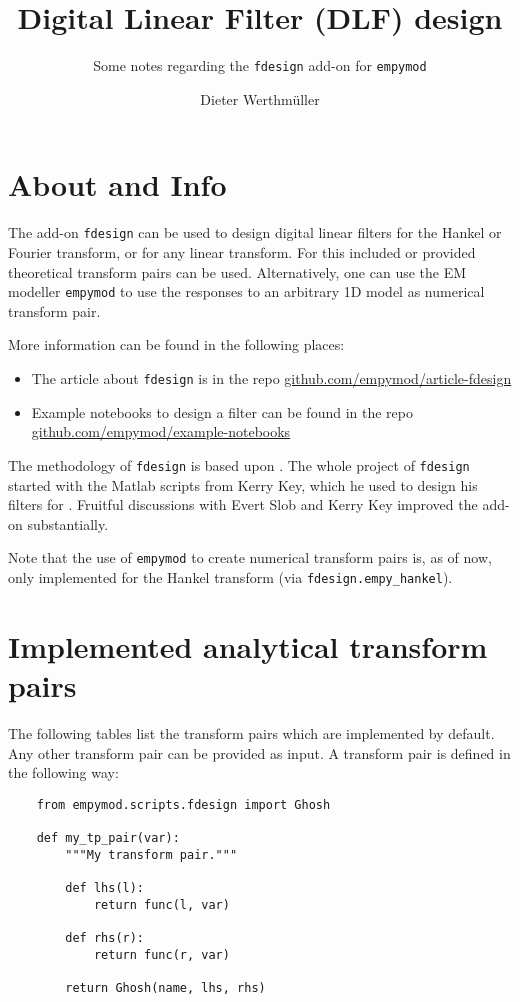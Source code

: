 \documentclass[fontsize=9pt, parskip=half, notitlepage, fleqn]{scrartcl}
\title{Digital Linear Filter (DLF) design}
\author{Dieter Werthmüller}
\subtitle{Some notes regarding the \texttt{fdesign} add-on for \texttt{empymod}}
\begin{document}
\maketitle

\section{About and Info}

The add-on \texttt{fdesign} can be used to design digital linear filters for
the Hankel or Fourier transform, or for any linear transform. For this included
or provided theoretical transform pairs can be used. Alternatively, one can use
the EM modeller \texttt{empymod} \citep{GEO.17.Werthmuller} to use the
responses to an arbitrary 1D model as numerical transform pair.

More information can be found in the following places:

\begin{itemize}
  \item The article about \texttt{fdesign} is in the repo
    \href{https://github.com/empymod/article-fdesign}{github.com/empymod/article-fdesign}
  \item Example notebooks to design a filter can be found in the repo
    \href{https://github.com/empymod/example-notebooks}{github.com/empymod/example-notebooks}
\end{itemize}


The methodology of \texttt{fdesign} is based upon \cite{GP.07.Kong}. The whole
project of \texttt{fdesign} started with the Matlab scripts from Kerry Key,
which he used to design his filters for \cite{GEO.09.Key, GEO.12.Key}. Fruitful
discussions with Evert Slob and Kerry Key improved the add-on substantially.

Note that the use of \texttt{empymod} to create numerical transform pairs is,
as of now, only implemented for the Hankel transform (via
\texttt{fdesign.empy\_hankel}).

\section{Implemented analytical transform pairs}

The following tables list the transform pairs which are implemented by default.
Any other transform pair can be provided as input. A transform pair is defined
in the following way:
\begin{verbatim}
    from empymod.scripts.fdesign import Ghosh

    def my_tp_pair(var):
        """My transform pair."""

        def lhs(l):
            return func(l, var)

        def rhs(r):
            return func(r, var)

        return Ghosh(name, lhs, rhs)
\end{verbatim}
\end{document}
